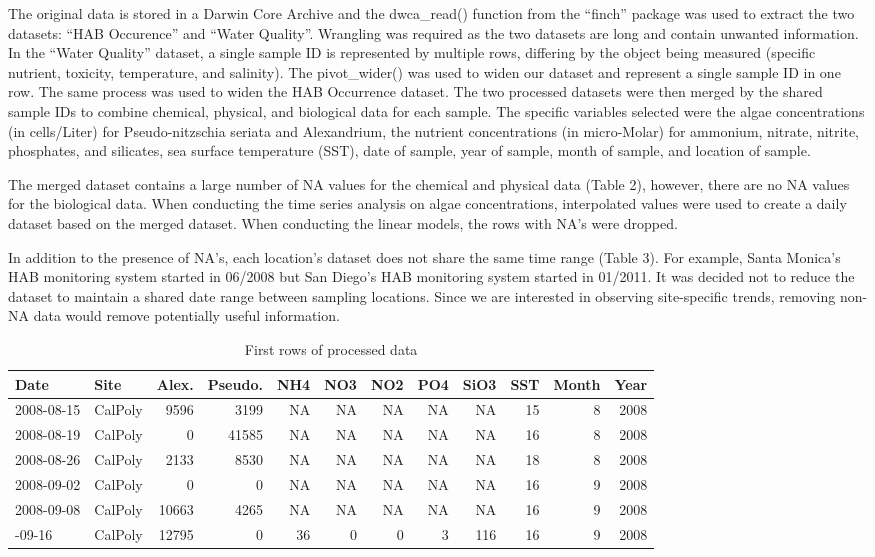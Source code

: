 \documentclass[
  12pt,
]{article}
\begin{document}
The original data is stored in a Darwin Core Archive and the
dwca\_read() function from the ``finch'' package was used to extract the
two datasets: ``HAB Occurence'' and ``Water Quality''. Wrangling was
required as the two datasets are long and contain unwanted information.
In the ``Water Quality'' dataset, a single sample ID is represented by
multiple rows, differing by the object being measured (specific
nutrient, toxicity, temperature, and salinity). The pivot\_wider() was
used to widen our dataset and represent a single sample ID in one row.
The same process was used to widen the HAB Occurrence dataset. The two
processed datasets were then merged by the shared sample IDs to combine
chemical, physical, and biological data for each sample. The specific
variables selected were the algae concentrations (in cells/Liter) for
Pseudo-nitzschia seriata and Alexandrium, the nutrient concentrations
(in micro-Molar) for ammonium, nitrate, nitrite, phosphates, and
silicates, sea surface temperature (SST), date of sample, year of
sample, month of sample, and location of sample.

The merged dataset contains a large number of NA values for the chemical
and physical data (Table 2), however, there are no NA values for the
biological data. When conducting the time series analysis on algae
concentrations, interpolated values were used to create a daily dataset
based on the merged dataset. When conducting the linear models, the rows
with NA's were dropped.

In addition to the presence of NA's, each location's dataset does not
share the same time range (Table 3). For example, Santa Monica's HAB
monitoring system started in 06/2008 but San Diego's HAB monitoring
system started in 01/2011. It was decided not to reduce the dataset to
maintain a shared date range between sampling locations. Since we are
interested in observing site-specific trends, removing non-NA data would
remove potentially useful information.

\newpage

\begingroup\fontsize{10}{12}\selectfont

\begin{longtable}[t]{llrrrrrrrrrr}
\caption{\label{tab:prelim data analysis}First rows of processed data}\\
\toprule
Date & Site & Alex. & Pseudo. & NH4 & NO3 & NO2 & PO4 & SiO3 & SST & Month & Year\\
\midrule
2008-08-15 & CalPoly & 9596 & 3199 & NA & NA & NA & NA & NA & 15 & 8 & 2008\\
2008-08-19 & CalPoly & 0 & 41585 & NA & NA & NA & NA & NA & 16 & 8 & 2008\\
2008-08-26 & CalPoly & 2133 & 8530 & NA & NA & NA & NA & NA & 18 & 8 & 2008\\
2008-09-02 & CalPoly & 0 & 0 & NA & NA & NA & NA & NA & 16 & 9 & 2008\\
2008-09-08 & CalPoly & 10663 & 4265 & NA & NA & NA & NA & NA & 16 & 9 & 2008\\
\addlinespace
2008-09-16 & CalPoly & 12795 & 0 & 36 & 0 & 0 & 3 & 116 & 16 & 9 & 2008\\
\bottomrule
\end{longtable}
\endgroup{}
\end{document}
